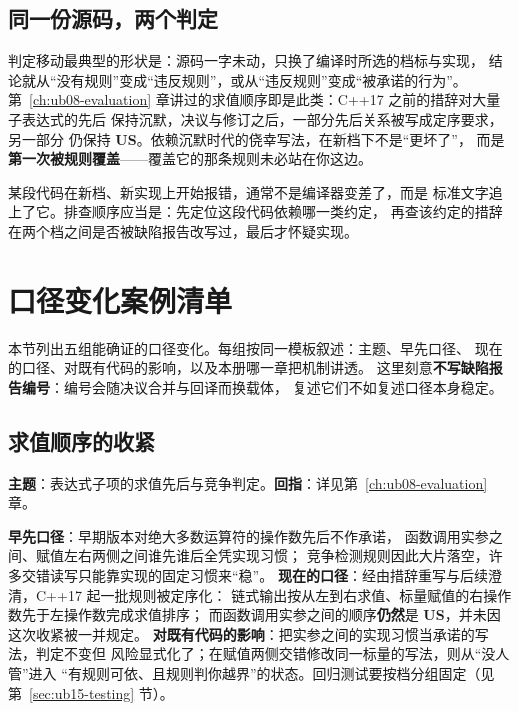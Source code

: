 \documentclass[12pt,a4paper,fontset=fandol]{ctexbook}
\newcommand{\cpp}[1]{C++#1}
\newcommand{\USB}{\textbf{\textsf{US}}}
\begin{document}
\subsection{同一份源码，两个判定}

判定移动最典型的形状是：源码一字未动，只换了编译时所选的档标与实现，
结论就从“没有规则”变成“违反规则”，或从“违反规则”变成“被承诺的行为”。
第~\ref{ch:ub08-evaluation} 章讲过的求值顺序即是此类：\cpp{17} 之前的措辞对大量子表达式的先后
保持沉默，决议与修订之后，一部分先后关系被写成定序要求，另一部分
仍保持 \USB{}。依赖沉默时代的侥幸写法，在新档下不是“更坏了”，
而是\textbf{第一次被规则覆盖}——覆盖它的那条规则未必站在你这边。

\begin{warning}[title=判定移动不等于实现退化]
某段代码在新档、新实现上开始报错，通常不是编译器变差了，而是
标准文字追上了它。排查顺序应当是：先定位这段代码依赖哪一类约定，
再查该约定的措辞在两个档之间是否被缺陷报告改写过，最后才怀疑实现。
\end{warning}

\section{口径变化案例清单}

本节列出五组能确证的口径变化。每组按同一模板叙述：主题、早先口径、
现在的口径、对既有代码的影响，以及本册哪一章把机制讲透。
这里刻意\textbf{不写缺陷报告编号}：编号会随决议合并与回译而换载体，
复述它们不如复述口径本身稳定。

\subsection{求值顺序的收紧}

\textbf{主题}：表达式子项的求值先后与竞争判定。\textbf{回指}：详见第~\ref{ch:ub08-evaluation} 章。

\textbf{早先口径}：早期版本对绝大多数运算符的操作数先后不作承诺，
函数调用实参之间、赋值左右两侧之间谁先谁后全凭实现习惯；
竞争检测规则因此大片落空，许多交错读写只能靠实现的固定习惯来“稳”。
\textbf{现在的口径}：经由措辞重写与后续澄清，\cpp{17} 起一批规则被定序化：
链式输出按从左到右求值、标量赋值的右操作数先于左操作数完成求值排序；
而函数调用实参之间的顺序\textbf{仍然}是 \USB{}，并未因这次收紧被一并规定。
\textbf{对既有代码的影响}：把实参之间的实现习惯当承诺的写法，判定不变但
风险显式化了；在赋值两侧交错修改同一标量的写法，则从“没人管”进入
“有规则可依、且规则判你越界”的状态。回归测试要按档分组固定（见 第~\ref{sec:ub15-testing} 节）。
\end{document}
